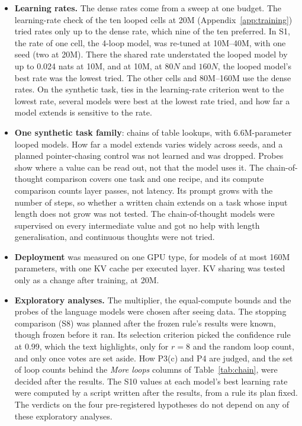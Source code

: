 \begin{itemize}
  \item \textbf{Learning rates.} The dense rates come from a sweep at one budget. The learning-rate check of the ten looped cells at 20M
  (Appendix~\ref{app:training}) tried rates only up to the dense rate, which nine of the ten preferred. In S1, the rate of
  one cell, the 4-loop model, was re-tuned at 10M--40M, with one seed (two at 20M). There the shared rate understated the
  looped model by up to 0.024 nats at 10M, and at 10M, at $80N$ and $160N$, the looped model's best rate was the lowest tried. The other cells and 80M--160M use the dense rates. On the
  synthetic task, ties in the learning-rate criterion went to the lowest rate, several models were best at the lowest
  rate tried, and how far a model extends is sensitive to the rate.
  \item \textbf{One synthetic task family}: chains of table lookups, with 6.6M-parameter looped models. How far a model extends varies widely across seeds, and a planned pointer-chasing control was not learned and was
  dropped. Probes
  show where a value can be read out, not that the model uses it. The chain-of-thought comparison covers one task and one recipe, and its compute comparison counts layer passes, not
  latency. Its prompt grows with the number of steps, so whether a written chain extends on a task whose input length
  does not grow was not tested. The chain-of-thought models were supervised on every intermediate value and got no help
  with length generalisation, and continuous thoughts \citep{hao2025training} were not tried.
  \item \textbf{Deployment} was measured on one GPU type, for models of at most 160M parameters, with one KV cache per
  executed layer. KV sharing was tested only as a change after training, at 20M.
  \item \textbf{Exploratory analyses.} The multiplier, the equal-compute bounds and the probes of the language models
  were chosen after seeing data. The stopping comparison (S8) was planned after the frozen rule's results were known,
  though frozen before it ran. Its selection criterion picked the confidence rule at 0.99, which the text highlights,
  only for $r = 8$ and the random loop count, and only once votes are set aside. How P3(c) and P4 are judged, and the set of loop counts behind the \emph{More loops}
  columns of Table~\ref{tab:chain}, were decided after the results. The S10 values at each model's best learning rate were computed by a script written after the results, from a rule its plan
  fixed. The verdicts on the four pre-registered hypotheses do not depend on any of these
  exploratory analyses.
\end{itemize}

